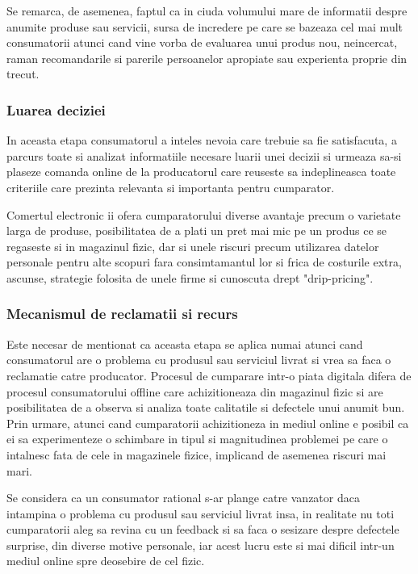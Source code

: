 \documentclass[a4paper, 12pt]{article}
\begin{document}
		\quad Se remarca, de asemenea, faptul ca in ciuda volumului mare de informatii despre anumite produse sau servicii, sursa de incredere pe care se bazeaza cel mai mult consumatorii atunci cand vine vorba de evaluarea unui produs nou, neincercat, raman recomandarile si parerile persoanelor apropiate sau experienta proprie din trecut.
		
		\subsubsection{Luarea deciziei}
		
		\quad\quad In aceasta etapa consumatorul a inteles nevoia care trebuie sa fie satisfacuta, a parcurs toate si analizat informatiile necesare luarii unei decizii si urmeaza sa-si plaseze comanda online de la producatorul care reuseste sa indeplineasca toate criteriile care prezinta relevanta si importanta pentru cumparator.
		
		\quad  Comertul electronic ii ofera cumparatorului diverse avantaje precum o varietate larga de produse, posibilitatea de a plati un pret mai mic pe un produs ce se regaseste si in magazinul fizic, dar si unele riscuri precum utilizarea datelor personale pentru alte scopuri  fara consimtamantul lor si frica de costurile extra, ascunse, strategie folosita de unele firme si cunoscuta drept "drip-pricing".
		
		\subsubsection{Mecanismul de reclamatii si recurs}
		
		\quad\quad Este necesar de mentionat ca aceasta etapa se aplica numai atunci cand consumatorul are o problema cu produsul sau serviciul livrat si vrea sa faca o reclamatie catre producator. Procesul de cumparare intr-o piata digitala difera de procesul consumatorului offline care achizitioneaza din magazinul fizic si are posibilitatea de a observa si analiza toate calitatile si defectele unui anumit bun. Prin urmare, atunci cand cumparatorii achizitioneza in mediul online e posibil ca ei sa experimenteze o schimbare in tipul si magnitudinea problemei pe care o intalnesc fata de cele in magazinele fizice, implicand de asemenea riscuri mai mari.
		
		\quad Se considera ca un consumator rational s-ar plange catre vanzator daca intampina o problema cu produsul sau serviciul livrat insa, in realitate nu toti cumparatorii aleg sa revina cu un feedback si sa faca o sesizare despre defectele surprise, din diverse motive personale, iar acest lucru este si mai dificil intr-un mediul online spre deosebire de cel fizic.
		
\end{document}
